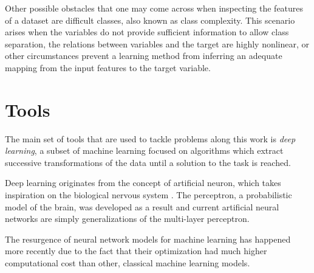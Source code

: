 





Other possible obstacles that one may come across when inspecting the features of a dataset are difficult classes, also known as class complexity. This scenario arises when the variables do not provide sufficient information to allow class separation, the relations between variables and the target are highly nonlinear, or other circumstances prevent a learning method from inferring an adequate mapping from the input features to the target variable.


\section{Tools}

The main set of tools that are used to tackle problems along this work is \textit{deep learning}, a subset of machine learning focused on algorithms which extract successive transformations of the data until a solution to the task is reached.

Deep learning originates from the concept of artificial neuron, which takes inspiration on the biological nervous system . The perceptron, a probabilistic model of the brain, was developed as a result  and current artificial neural networks are simply generalizations of the multi-layer perceptron.

The resurgence of neural network models for machine learning has happened more recently due to the fact that their optimization had much higher computational cost than other, classical machine learning models.


